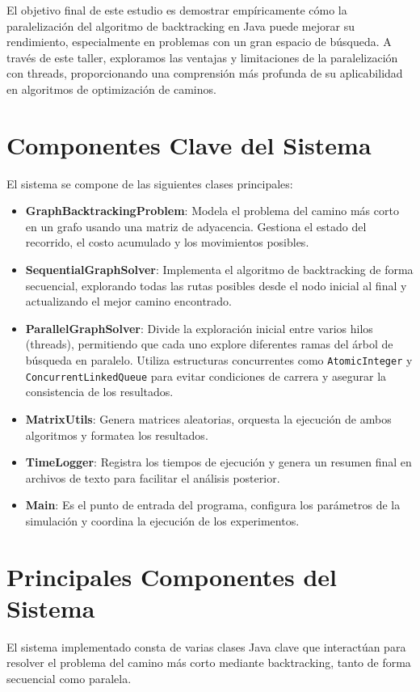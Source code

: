 \documentclass[12pt]{article}
\begin{document}
El objetivo final de este estudio es demostrar empíricamente cómo la paralelización del algoritmo de backtracking en Java puede mejorar su rendimiento, especialmente en problemas con un gran espacio de búsqueda. A través de este taller, exploramos las ventajas y limitaciones de la paralelización con threads, proporcionando una comprensión más profunda de su aplicabilidad en algoritmos de optimización de caminos.

\section*{Componentes Clave del Sistema}
El sistema se compone de las siguientes clases principales:
\begin{itemize}
    \item \textbf{GraphBacktrackingProblem}: Modela el problema del camino más corto en un grafo usando una matriz de adyacencia. Gestiona el estado del recorrido, el costo acumulado y los movimientos posibles.
    \item \textbf{SequentialGraphSolver}: Implementa el algoritmo de backtracking de forma secuencial, explorando todas las rutas posibles desde el nodo inicial al final y actualizando el mejor camino encontrado.
    \item \textbf{ParallelGraphSolver}: Divide la exploración inicial entre varios hilos (threads), permitiendo que cada uno explore diferentes ramas del árbol de búsqueda en paralelo. Utiliza estructuras concurrentes como \texttt{AtomicInteger} y \texttt{ConcurrentLinkedQueue} para evitar condiciones de carrera y asegurar la consistencia de los resultados.
    \item \textbf{MatrixUtils}: Genera matrices aleatorias, orquesta la ejecución de ambos algoritmos y formatea los resultados.
    \item \textbf{TimeLogger}: Registra los tiempos de ejecución y genera un resumen final en archivos de texto para facilitar el análisis posterior.
    \item \textbf{Main}: Es el punto de entrada del programa, configura los parámetros de la simulación y coordina la ejecución de los experimentos.
\end{itemize}

\section*{Principales Componentes del Sistema}

El sistema implementado consta de varias clases Java clave que interactúan para resolver el problema del camino más corto mediante backtracking, tanto de forma secuencial como paralela.
\end{document}
